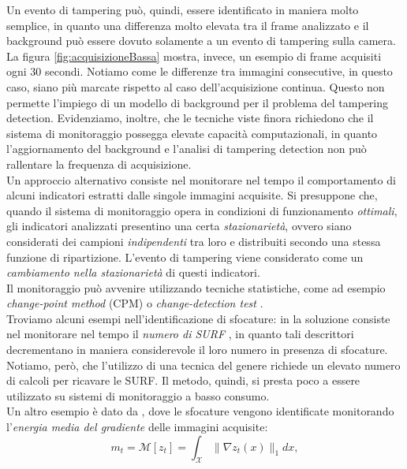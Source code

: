 Un evento di tampering pu\`o, quindi, essere identificato in maniera molto semplice, in quanto una differenza molto elevata tra il frame analizzato e il background pu\`o essere dovuto solamente a un evento di tampering sulla camera.
La figura \ref{fig:acquisizioneBassa} mostra, invece, un esempio di frame acquisiti ogni 30 secondi.
Notiamo come le differenze tra immagini consecutive, in questo caso, siano pi\`u marcate rispetto al caso dell'acquisizione continua. 
Questo non permette l'impiego di un modello di background per il problema del tampering detection.
Evidenziamo, inoltre, che le tecniche viste finora richiedono che il sistema di monitoraggio possegga elevate capacit\`a computazionali, in quanto l'aggiornamento del background e l'analisi di tampering detection non pu\`o rallentare la frequenza di acquisizione.\\
Un approccio alternativo consiste nel monitorare nel tempo il comportamento di alcuni indicatori estratti dalle singole immagini acquisite.
Si presuppone che, quando il sistema di monitoraggio opera in condizioni di funzionamento \textit{ottimali}, gli indicatori analizzati presentino una certa \textit{stazionariet\`a}, ovvero siano considerati dei campioni \textit{indipendenti} tra loro e distribuiti secondo una stessa funzione di ripartizione.
L'evento di tampering viene considerato come un \textit{cambiamento nella stazionariet\`a} di questi indicatori.\\
Il monitoraggio pu\`o avvenire utilizzando tecniche statistiche, come ad esempio \textit{change-point method} (CPM) \cite{ross2011nonparametric} o \textit{change-detection test} \cite{pimentel2014review}.\\
Troviamo alcuni esempi nell'identificazione di sfocature: in \cite{tsesmelis2013tamper} la soluzione consiste nel monitorare nel tempo il \textit{numero di SURF} \cite{bay2006surf}, in quanto tali descrittori decrementano in maniera considerevole il loro numero in presenza di sfocature.
Notiamo, per\`o, che l'utilizzo di una tecnica del genere richiede un elevato numero di calcoli per ricavare le SURF.
Il metodo, quindi, si presta poco a essere utilizzato su sistemi di monitoraggio a basso consumo.\\
Un altro esempio \`e dato da \cite{alippi2010detecting}, dove le sfocature vengono identificate monitorando l'\textit{energia media del gradiente} delle immagini acquisite:
\[m_t = \mathcal{M}[z_t] = \int_{\mathcal{X}}\| \nabla z_t(x) \| _1 dx,\]
